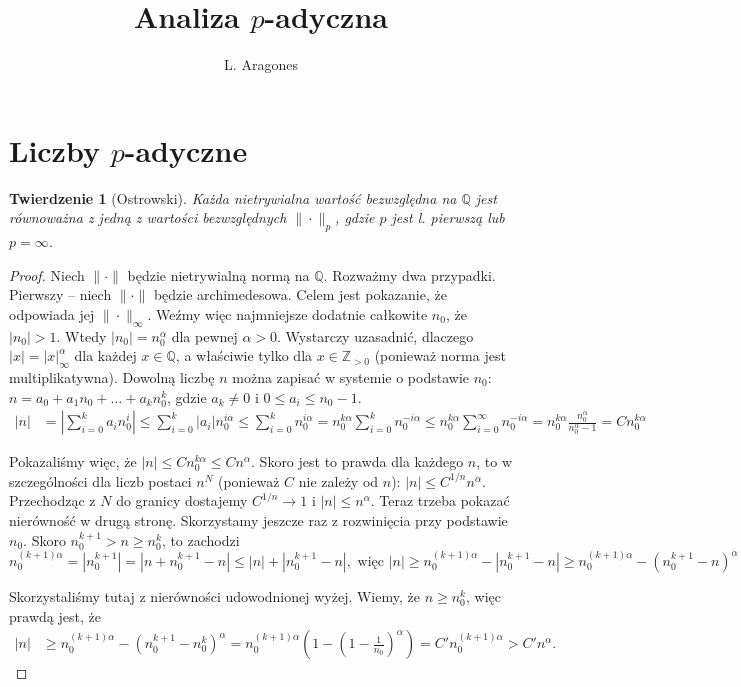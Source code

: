 \documentclass[a4paper, twoside]{extarticle}
\author{L. Aragones}
\title{Analiza $p$-adyczna}
\newcommand{\Q}{\mathbb{Q}}
\newcommand{\Z}{\mathbb{Z}}
\newcommand{\n}{\|\cdot\|}
\newtheorem{mojetw}{Twierdzenie}
\begin{document}
 
\maketitle
\tableofcontents

\section{Liczby $p$-adyczne}
\begin{mojetw}[Ostrowski]
Każda nietrywialna wartość bezwzględna na $\Q$ jest równoważna z jedną z wartości bezwzględnych $\|\cdot\|_p$, gdzie $p$ jest l. pierwszą lub $p = \infty$.
\end{mojetw}

\begin{proof}
Niech $\n$ będzie nietrywialną normą na $\Q$.
Rozważmy dwa przypadki.
Pierwszy -- niech $\n$ będzie archimedesowa.
Celem jest pokazanie, że odpowiada jej $\n_\infty$.
Weźmy więc najmniejsze dodatnie całkowite $n_0$, że $|n_0| > 1$.
Wtedy $|n_0| = n_0^\alpha$ dla pewnej $\alpha > 0$.
Wystarczy uzasadnić, dlaczego $|x| = |x|_\infty^\alpha$ dla każdej $x \in \Q$, a właściwie tylko dla $x \in \Z_{>0}$ (ponieważ norma jest multiplikatywna).
Dowolną liczbę $n$ można zapisać w systemie o podstawie $n_0$: $n = a_0 + a_1 n_0 + \dots + a_kn_0^k$, gdzie $a_k \neq 0$ i $0 \le a_i \le n_0-1$.
\begin{align*}
|n| & = \left|\sum_{i=0}^k a_in_0^i\right| \le \sum_{i=0}^k \left|a_i\right| n_0^{i \alpha} \le \sum_{i=0}^k n_0^{i \alpha} = n_0^{k \alpha} \sum_{i = 0}^k n_0^{-i \alpha} \le n_0^{k \alpha} \sum_{i = 0}^\infty n_0^{-i \alpha} = n_0^{k \alpha} \frac{n_0^\alpha}{n_0^\alpha - 1} = C n_0^{k \alpha}
\end{align*}

Pokazaliśmy więc, że $|n| \le Cn_0^{k \alpha} \le C n^\alpha$.
Skoro jest to prawda dla każdego $n$, to w szczególności dla liczb postaci $n^N$ (ponieważ $C$ nie zależy od $n$): $|n| \le C^{1/n}n^\alpha$.
Przechodząc z $N$ do granicy dostajemy $C^{1/n} \to 1$ i $|n| \le n^\alpha$.
Teraz trzeba pokazać nierówność w drugą stronę.
Skorzystamy jeszcze raz z rozwinięcia przy podstawie $n_0$.
Skoro $n_0^{k+1} > n \ge n_0^k$, to zachodzi
\[n_0^{(k+1) \alpha} = |n_0^{k+1}| = |n+n_0^{k+1} - n| \le |n| + |n_0^{k+1} - n|, \text{ więc } |n| \ge n_0^{(k+1)\alpha} - |n_0^{k+1} -n| \ge n_0^{(k+1)\alpha} - (n_0^{k+1} -n)^\alpha\]

Skorzystaliśmy tutaj z nierówności udowodnionej wyżej.
Wiemy, że $n \ge n_0^k$, więc prawdą jest, że
\begin{align*}
|n| & \ge n_0^{(k+1)\alpha} - (n_0^{k+1} - n_0^k)^\alpha = n_0^{(k+1) \alpha} \left(1 - \left(1 - \frac{1}{n_0}\right)^\alpha\right) = C' n_0^{(k+1)\alpha} > C' n^\alpha.
\end{align*}


\end{proof}
\end{document}
